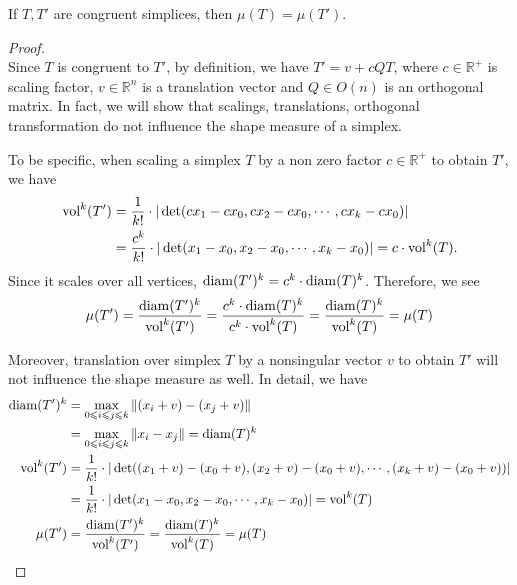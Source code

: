     \begin{lemma*}
    If $T, T'$ are congruent simplices, then $\mu(T) = \mu(T')$.
    \end{lemma*}
    \begin{proof}\mbox{}\\
    Since $T$ is congruent to $T'$, by definition, we have $T' = v + cQT$, where $c\in\mathbb{R}^{+}$ is scaling factor, $v\in\mathbb{R}^n$ is a translation vector and $Q\in O(n)$ is an orthogonal matrix. In fact, we will show that scalings, translations, orthogonal transformation do not influence the shape measure of a simplex. 
    
    To be specific, when scaling a simplex $T$ by a non zero factor $c\in\mathbb{R}^{+}$ to obtain $T'$, we have 
    \begin{align*}
     \operatorname{vol}^k(T') &= \frac{1}{k!}\cdot|\det(cx_1-cx_0, cx_2-cx_0,\cdots, cx_k-cx_0)| \\
               &= \frac{c^k}{k!}\cdot|\det(x_1-x_0, x_2-x_0,\cdots, x_k-x_0)| = c\cdot \operatorname{vol}^k(T).
    \end{align*}
    Since it scales over all vertices, $\operatorname{diam}(T')^k = c^k\cdot \operatorname{diam}(T)^k$. Therefore, we see
    \begin{align*}
    \mu(T') = \frac{\operatorname{diam}(T')^k}{\operatorname{vol}^k(T')} = \frac{c^k\cdot \operatorname{diam}(T)^k}{c^k\cdot \operatorname{vol}^k(T)} = \frac{\operatorname{diam}(T)^k}{\operatorname{vol}^k(T)} = \mu(T)
    \end{align*}

    Moreover, translation over simplex $T$ by a nonsingular vector $v$ to obtain $T'$ will not influence the shape measure as well. In detail, we have
    \begin{align*}
    \operatorname{diam}(T')^k &= \max_{0\leqslant i\leqslant j\leqslant k} \|(x_i + v) - (x_j + v)\|\\ 
               &= \max_{0\leqslant i\leqslant j\leqslant k}\|x_i - x_j\| = \operatorname{diam}(T)^k \\
    \operatorname{vol}^k(T') &= \frac{1}{k!}\cdot|\det((x_1+v) - (x_0+v), (x_2+v)-(x_0+v),\cdots,(x_k+v)-(x_0+v))|\\
              &= \frac{1}{k!}\cdot|\det(x_1-x_0, x_2-x_0,\cdots, x_k-x_0)| = \operatorname{vol}^k(T)\\
    \mu(T') &= \frac{\operatorname{diam}(T')^k}{\operatorname{vol}^k(T')} = \frac{\operatorname{diam}(T)^k}{\operatorname{vol}^k(T)} = \mu(T)
    \end{align*}


\end{proof}
